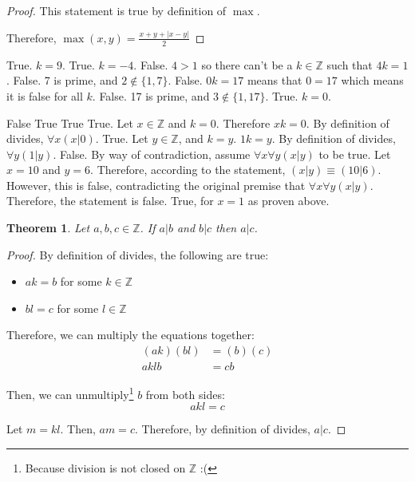 \documentclass{article}
\newtheorem{theorem}{Theorem}
\numberwithin{subcase}{case}
\begin{document}
\begin{outline}[enumerate]
\begin{proof}
        This statement is true by definition of $\max$. 
        
        Therefore, $\max(x, y) = \frac{x + y + | x - y |}{2}$
    \end{proof}

    \1 
        \2 True. $k = 9$.
        \2 True. $k = -4$.
        \2 False. $4 > 1$ so there can't be a $k \in \mathbb{Z}$ such that $4k = 1$.
        \2 False. 7 is prime, and $2 \notin \{1, 7\}$.
        \2 False. $0k = 17$ means that $0 = 17$ which means it is false for all $k$.
        \2 False. 17 is prime, and $3 \notin \{1, 17\}$.
        \2 True. $k = 0$.

    \1
        \2 False 
        \2 True 
        \2 True
        \2 True. Let $x \in \mathbb{Z}$ and $k = 0$. Therefore $xk = 0$. By definition of 
            divides, $\forall x (x | 0)$.
        \2 True. Let $y \in \mathbb{Z}$, and $k = y$. $1k = y$. By definition of divides, 
            $\forall y(1 | y)$.
        \2 False. By way of contradiction, assume $\forall x \forall y (x | y)$ to be true. 
            Let $x = 10$ and $y = 6$. Therefore, according to the statement, 
            $(x | y) \equiv (10 | 6)$. However, this is false, contradicting
            the original premise that $\forall x \forall y (x | y)$. Therefore, 
            the statement is false.
        \2 True, for $x = 1$ as proven above.

    \1 \begin{theorem}
        Let $a, b, c \in \mathbb{Z}$. If $a | b$ and $b | c$ then $a | c$.
    \end{theorem}

    \begin{proof}
        By definition of divides, the following are true:
        \begin{itemize}
            \item $ak = b$ for some $k \in \mathbb{Z}$
            \item $bl = c$ for some $l \in \mathbb{Z}$
        \end{itemize}

        Therefore, we can multiply the equations together:
        \begin{equation}
            \begin{aligned}
                (ak)(bl) &= (b)(c) \\
                aklb &= cb 
            \end{aligned}
        \end{equation}

        Then, we can unmultiply\footnote{Because division is not closed on 
        $\mathbb{Z}$ :(} $b$ from both sides: 
        \begin{equation}
            akl = c
        \end{equation}

        Let $m = kl$. Then, $am = c$. Therefore, by definition of divides, 
        $a | c$.
    \end{proof}

\end{outline} 
\end{document}
